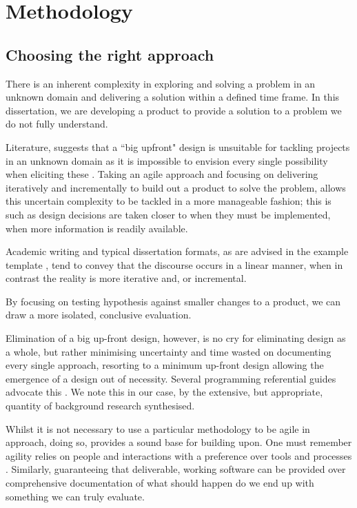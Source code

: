 \chapter{Methodology}

\section{Choosing the right approach}

There is an inherent complexity in exploring and solving a problem in an unknown domain and delivering a solution within a defined time frame. In this dissertation, we are developing a product to provide a solution to a problem we do not fully understand. 

Literature, suggests that a ``big upfront" design is unsuitable for tackling projects in an unknown domain as it is impossible to envision every single possibility when eliciting these \parencite{fowler2001design}. Taking an agile approach and focusing on delivering iteratively and incrementally to build out a product to solve the problem, allows this uncertain complexity to be tackled in a more manageable fashion; this is such as design decisions are taken closer to when they must be implemented, when more information is readily available. 

Academic writing and typical dissertation formats, as are advised in the example template \parencite{dissertationTemplateKent}, tend to convey that the discourse occurs in a linear manner, when in contrast the reality is more iterative and, or incremental. 

By focusing on testing hypothesis against smaller changes to a product, we can draw a more isolated, conclusive evaluation.

Elimination of a big up-front design, however, is no cry for eliminating design as a whole, but rather minimising uncertainty and time wasted on documenting every single approach, resorting to a minimum up-front design allowing the emergence of a design out of necessity. Several programming referential guides advocate this \parencite{codeComplete}. We note this in our case, by the extensive, but appropriate, quantity of background research synthesised.

Whilst it is not necessary to use a particular methodology to be agile in approach, doing so, provides a sound base for building upon. One must remember agility relies on people and interactions with a preference over tools and processes \parencite{beck2001agile}. Similarly, guaranteeing that deliverable, working software can be provided over comprehensive documentation of what should happen do we end up with something we can truly evaluate. 

